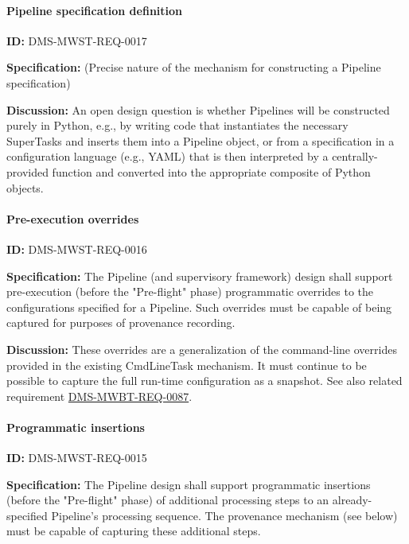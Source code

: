 \documentclass[SE,toc,lsstdraft]{lsstdoc}
\begin{document}
\paragraph{Pipeline specification definition}\hfill  %

\label{DMS-MWST-REQ-0017}
\textbf{ID:} DMS-MWST-REQ-0017

\textbf{Specification:}
(Precise nature of the mechanism for constructing a Pipeline specification)

\textbf{Discussion:}
An open design question is whether Pipelines will be constructed purely in Python, e.g., by writing code that instantiates the necessary SuperTasks and inserts them into a Pipeline object, or from a specification in a configuration language (e.g., YAML) that is then interpreted by a centrally-provided function and converted into the appropriate composite of Python objects.

\paragraph{Pre-execution overrides}\hfill  %

\label{DMS-MWST-REQ-0016}
\textbf{ID:} DMS-MWST-REQ-0016

\textbf{Specification:}
The Pipeline (and supervisory framework) design shall support pre-execution (before the "Pre-flight" phase) programmatic overrides to the configurations specified for a Pipeline. Such overrides must be capable of being captured for purposes of provenance recording.

\textbf{Discussion:}
These overrides are a generalization of the command-line overrides provided in the existing CmdLineTask mechanism. It must continue to be possible to capture the full run-time configuration as a snapshot. See also related requirement \hyperref[DMS-MWBT-REQ-0087]{DMS-MWBT-REQ-0087}.

\paragraph{Programmatic insertions}\hfill  %

\label{DMS-MWST-REQ-0015}
\textbf{ID:} DMS-MWST-REQ-0015

\textbf{Specification:}
The Pipeline design shall support programmatic insertions (before the "Pre-flight" phase) of additional processing steps to an already-specified Pipeline’s processing sequence. The provenance mechanism (see below) must be capable of capturing these additional steps.
\end{document}
